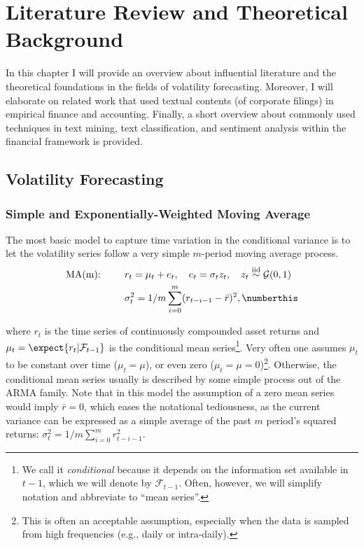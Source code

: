 \section{Literature Review and Theoretical Background}
\label{sec: lit_rev}

In this chapter I will provide an overview about influential literature and the theoretical foundations in the fields of volatility forecasting. Moreover, I will elaborate on related work that used textual contents (of corporate filings) in empirical finance and accounting. Finally, a short overview about commonly used techniques in text mining, text classification, and sentiment analysis within the financial framework is provided.


\subsection{Volatility Forecasting}
\label{ssec: lit_rev_vola}

\subsubsection{Simple and Exponentially-Weighted Moving Average}
\label{sssec: lit_rev_vola_ma}

The most basic model to capture time variation in the conditional variance is to let the volatility series follow a very simple $m$-period moving average process.
\begin{align*}
\text{MA(m): }\qquad & r_t = \mu_{t} + e_{t}, \quad e_{t} = \sigma_{t} z_{t},\quad  z_{t} \overset{\text{iid}}{\sim} \mathcal{G}(0,1) \\
& \sigma_t^2 = 1/m \sum_{i=0}^m (r_{t-i-1} - \bar{r})^2, \numberthis 
\end{align*}

where  $r_t$ is the time series of continuously compounded asset returns and $\mu_{t} = \expect{r_t|\mathcal{F}_{t-1}}$ is the conditional mean series\footnote{We call it \emph{conditional} because it depends on the information set available in $t-1$, which we will denote by $\mathcal{F}_{t-1}$. Often, however, we will simplify notation and abbreviate to \enquote{mean series}.}. Very often one assumes $\mu_{t}$ to be constant over time ($ \mu_{t}=\mu $), or even zero ($ \mu_{t}=\mu=0 $)\footnote{This is often an acceptable assumption, especially when the data is sampled from high frequencies (e.g., daily or intra-daily).}. Otherwise, the conditional mean series usually is described by some simple process out of the ARMA family.
Note that in this model the assumption of a zero mean series would imply $\bar{r}=0$, which eases the notational tediousness, as the current variance can be expressed as a simple average of the past $m$ period's squared returns: $\sigma_t^2 = 1/m \sum_{i=0}^m r_{t-i-1}^2 $.

